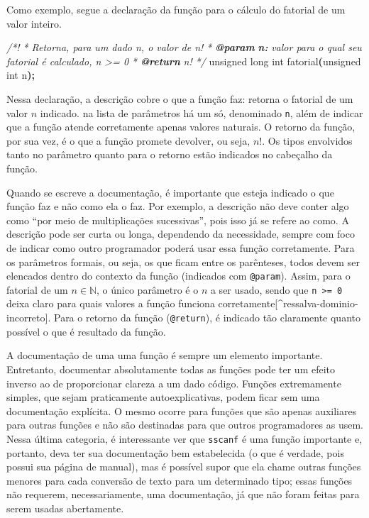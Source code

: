 \documentclass[
  11pt,
  a4paper,
]{scrbook}
\newenvironment{Shaded}{\begin{snugshade}}{\end{snugshade}}
\newcommand{\AnnotationTok}[1]{\textcolor[rgb]{0.56,0.35,0.01}{\textbf{\textit{#1}}}}
\newcommand{\CommentTok}[1]{\textcolor[rgb]{0.56,0.35,0.01}{\textit{#1}}}
\newcommand{\CommentVarTok}[1]{\textcolor[rgb]{0.56,0.35,0.01}{\textbf{\textit{#1}}}}
\newcommand{\DataTypeTok}[1]{\textcolor[rgb]{0.13,0.29,0.53}{#1}}
\newcommand{\NormalTok}[1]{#1}
\newcommand{\OperatorTok}[1]{\textcolor[rgb]{0.81,0.36,0.00}{\textbf{#1}}}
\begin{document}
Como exemplo, segue a declaração da função para o cálculo do fatorial de
um valor inteiro.

\begin{Shaded}
\begin{Highlighting}[]
\CommentTok{/*!}
\CommentTok{ * Retorna, para um dado n, o valor de n!}
\CommentTok{ * }\AnnotationTok{@param}\CommentTok{ }\CommentVarTok{n:}\CommentTok{ valor para o qual seu fatorial é calculado, n \textgreater{}= 0}
\CommentTok{ * }\AnnotationTok{@return}\CommentTok{ n!}
\CommentTok{ */}
\DataTypeTok{unsigned} \DataTypeTok{long} \DataTypeTok{int}\NormalTok{ fatorial}\OperatorTok{(}\DataTypeTok{unsigned} \DataTypeTok{int}\NormalTok{ n}\OperatorTok{);}
\end{Highlighting}
\end{Shaded}

Nessa declaração, a descrição cobre o que a função faz: retorna o
fatorial de um valor \(n\) indicado. na lista de parâmetros há um só,
denominado \texttt{n}, além de indicar que a função atende corretamente
apenas valores naturais. O retorno da função, por sua vez, é o que a
função promete devolver, ou seja, \(n!\). Os tipos envolvidos tanto no
parâmetro quanto para o retorno estão indicados no cabeçalho da função.

Quando se escreve a documentação, é importante que esteja indicado o que
função faz e não como ela o faz. Por exemplo, a descrição não deve
conter algo como ``por meio de multiplicações sucessivas'', pois isso já
se refere ao como. A descrição pode ser curta ou longa, dependendo da
necessidade, sempre com foco de indicar como outro programador poderá
usar essa função corretamente. Para os parâmetros formais, ou seja, os
que ficam entre os parênteses, todos devem ser elencados dentro do
contexto da função (indicados com \texttt{@param}). Assim, para o
fatorial de um \({n \in \mathbb{N}}\), o único parâmetro é o \(n\) a ser
usado, sendo que \texttt{n\ \textgreater{}=\ 0} deixa claro para quais
valores a função funciona
corretamente{[}\^{}ressalva-dominio-incorreto{]}. Para o retorno da
função (\texttt{@return}), é indicado tão claramente quanto possível o
que é resultado da função.

A documentação de uma uma função é sempre um elemento importante.
Entretanto, documentar absolutamente todas as funções pode ter um efeito
inverso ao de proporcionar clareza a um dado código. Funções
extremamente simples, que sejam praticamente autoexplicativas, podem
ficar sem uma documentação explícita. O mesmo ocorre para funções que
são apenas auxiliares para outras funções e não são destinadas para que
outros programadores as usem. Nessa última categoria, é interessante ver
que \texttt{sscanf} é uma função importante e, portanto, deva ter sua
documentação bem estabelecida (o que é verdade, pois possui sua página
de manual), mas é possível supor que ela chame outras funções menores
para cada conversão de texto para um determinado tipo; essas funções não
requerem, necessariamente, uma documentação, já que não foram feitas
para serem usadas abertamente.
\end{document}
